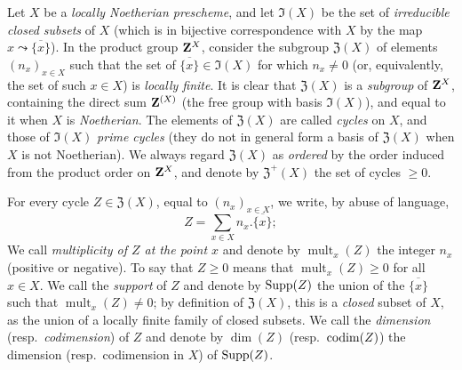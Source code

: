 \begin{env}[21.6.1]
\label{IV.21.6.1}
Let $X$ be a \emph{locally Noetherian prescheme}, and let $\mathfrak{I}(X)$ be the set of \emph{irreducible closed subsets} of $X$ (which is in bijective correspondence with $X$ by the map $x\leadsto\overline{\{x\}}$).
In the product group $\mathbf{Z}^X$, consider the subgroup $\mathfrak{Z}(X)$ of elements $(n_x)_{x\in X}$ such that the set of $\overline{\{x\}}\in\mathfrak{I}(X)$ for which $n_x\neq0$ (or, equivalently, the set of such $x\in X$) is \emph{locally finite}.
It is clear that $\mathfrak{Z}(X)$ is a \emph{subgroup} of $\mathbf{Z}^X$, containing the direct sum $\mathbf{Z}^{(X)}$ (the free group with basis $\mathfrak{I}(X)$), and equal to it when $X$ is \emph{Noetherian}.
The elements of $\mathfrak{Z}(X)$ are called \emph{cycles} on $X$, and those of $\mathfrak{I}(X)$ \emph{prime cycles} (they do not in general form a basis of $\mathfrak{Z}(X)$ when $X$ is not Noetherian).
We always regard $\mathfrak{Z}(X)$ as \emph{ordered} by the order induced from the product order on $\mathbf{Z}^X$, and denote by $\mathfrak{Z}^+(X)$ the set of cycles $\geq0$.


For every cycle $Z\in\mathfrak{Z}(X)$, equal to $(n_x)_{x\in X}$, we write, by abuse of language,
\[
  Z=\sum_{x\in X}n_x.\overline{\{x\}};
\]
We call \emph{multiplicity of $Z$ at the point $x$} and denote by $\operatorname{mult}_x(Z)$ the integer $n_x$ (positive or negative).
To say that $Z\geq 0$ means that $\operatorname{mult}_x(Z)\geq 0$ for all $x\in X$.
We call the \emph{support} of $Z$ and denote by $\operatorname{Supp}(Z)$ the union of the $\overline{\{x\}}$ such that $\operatorname{mult}_x(Z)\neq 0$;
by definition of $\mathfrak{Z}(X)$, this is a \emph{closed} subset of $X$, as the union of a locally finite family of closed subsets.
We call the \emph{dimension} (resp.\ \emph{codimension}) of $Z$ and denote by $\dim(Z)$ (resp.\ $\operatorname{codim}(Z)$) the dimension (resp.\ codimension in $X$) of $\operatorname{Supp}(Z)$.
\end{env}

